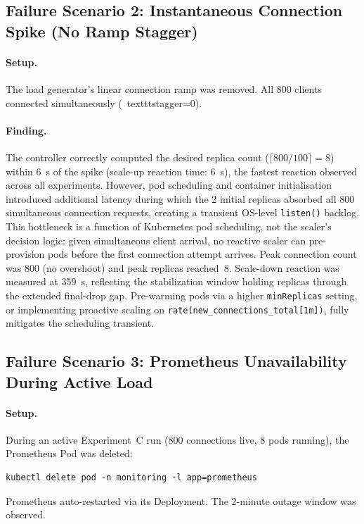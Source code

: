 \documentclass[twocolumn]{svjour3}
\begin{document}
\subsection{Failure Scenario 2: Instantaneous Connection Spike (No Ramp Stagger)}

\paragraph{Setup.} The load generator's linear connection ramp was removed. All 800 clients connected simultaneously (\ texttt{stagger=0}).

\paragraph{Finding.} The controller correctly computed the desired replica count ($\lceil800/100\rceil=8$) within 6~s of the spike (scale-up reaction time: 6~s), the fastest reaction observed across all experiments.  However, pod scheduling and container initialisation introduced additional latency during which the 2 initial replicas absorbed all 800 simultaneous connection requests, creating a transient OS-level \texttt{listen()} backlog.  This bottleneck is a function of Kubernetes pod scheduling, not the scaler's decision logic: given simultaneous client arrival, no reactive scaler can pre-provision pods before the first connection attempt arrives.  Peak connection count was 800 (no overshoot) and peak replicas reached~8.  Scale-down reaction was measured at 359~s, reflecting the stabilization window holding replicas through the extended final-drop gap.  Pre-warming pods via a higher \texttt{minReplicas} setting, or implementing proactive scaling on \texttt{rate(new\_connections\_total[1m])}, fully mitigates the scheduling transient.

\subsection{Failure Scenario 3: Prometheus Unavailability During Active Load}

\paragraph{Setup.} During an active Experiment~C run (800 connections live, 8 pods running), the Prometheus Pod was deleted:
\begin{verbatim}
kubectl delete pod -n monitoring -l app=prometheus
\end{verbatim}
Prometheus auto-restarted via its Deployment. The 2-minute outage window was observed.
\end{document}
